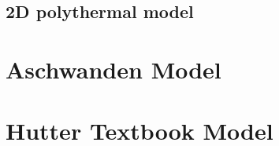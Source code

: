 \documentclass[a4paper,12pt]{article}
\begin{document}
\subsection{2D polythermal model}

\section{Aschwanden Model}

\section{Hutter Textbook Model}






{}

\end{document}
